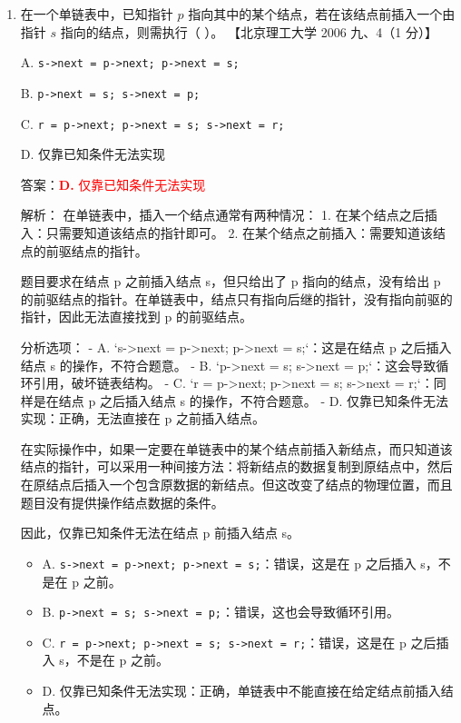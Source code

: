 \documentclass[lang=cn,newtx,10pt,scheme=chinese]{../../../elegantbook}
\begin{document}
\begin{enumerate}
        \item 在一个单链表中，已知指针 $p$ 指向其中的某个结点，若在该结点前插入一个由指针 $s$ 指向的结点，则需执行（ ）。  
        【北京理工大学 2006 九、4（1 分）】  
    
        A. \texttt{s->next = p->next; p->next = s;}  
    
        B. \texttt{p->next = s; s->next = p;}  
    
        C. \texttt{r = p->next; p->next = s; s->next = r;}  
    
        D. 仅靠已知条件无法实现  

        答案：\textcolor{red}{\textbf{D.} 仅靠已知条件无法实现}

        解析：
        在单链表中，插入一个结点通常有两种情况：
        1. 在某个结点之后插入：只需要知道该结点的指针即可。
        2. 在某个结点之前插入：需要知道该结点的前驱结点的指针。

        题目要求在结点 p 之前插入结点 s，但只给出了 p 指向的结点，没有给出 p 的前驱结点的指针。在单链表中，结点只有指向后继的指针，没有指向前驱的指针，因此无法直接找到 p 的前驱结点。

        分析选项：
        - A. `s->next = p->next; p->next = s;`：这是在结点 p 之后插入结点 s 的操作，不符合题意。
        - B. `p->next = s; s->next = p;`：这会导致循环引用，破坏链表结构。
        - C. `r = p->next; p->next = s; s->next = r;`：同样是在结点 p 之后插入结点 s 的操作，不符合题意。
        - D. 仅靠已知条件无法实现：正确，无法直接在 p 之前插入结点。

        在实际操作中，如果一定要在单链表中的某个结点前插入新结点，而只知道该结点的指针，可以采用一种间接方法：将新结点的数据复制到原结点中，然后在原结点后插入一个包含原数据的新结点。但这改变了结点的物理位置，而且题目没有提供操作结点数据的条件。

        因此，仅靠已知条件无法在结点 p 前插入结点 s。

        \begin{itemize}
            \item A. \texttt{s->next = p->next; p->next = s;}：错误，这是在 p 之后插入 s，不是在 p 之前。
            \item B. \texttt{p->next = s; s->next = p;}：错误，这也会导致循环引用。
            \item C. \texttt{r = p->next; p->next = s; s->next = r;}：错误，这是在 p 之后插入 s，不是在 p 之前。
            \item D. 仅靠已知条件无法实现：正确，单链表中不能直接在给定结点前插入结点。
        \end{itemize}
    

\end{enumerate}
\end{document}
